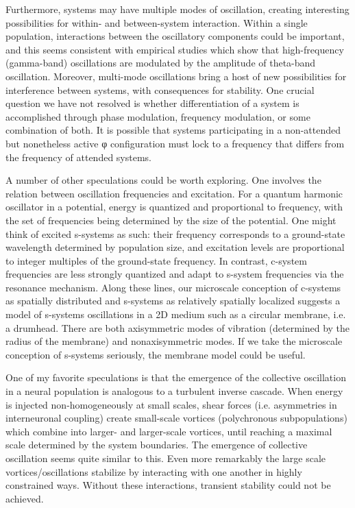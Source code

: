   Furthermore, systems may have multiple modes of oscillation, creating interesting possibilities for within- and between-system interaction. Within a single population, interactions between the oscillatory components could be important, and this seems consistent with empirical studies which show that high-frequency (gamma-band) oscillations are modulated by the amplitude of theta-band oscillation. Moreover, multi-mode oscillations bring a host of new possibilities for interference between systems, with consequences for stability. One crucial question we have not resolved is whether differentiation of a system is accomplished through phase modulation, frequency modulation, or some combination of both. It is possible that systems participating in a non-attended but nonetheless active φ configuration must lock to a frequency that differs from the frequency of attended systems.

  A number of other speculations could be worth exploring. One involves the relation between oscillation frequencies and excitation. For a quantum harmonic oscillator in a potential, energy is quantized and proportional to frequency, with the set of frequencies being determined by the size of the potential. One might think of excited s-systems as such: their frequency corresponds to a ground-state wavelength determined by population size, and excitation levels are proportional to integer multiples of the ground-state frequency. In contrast, c-system frequencies are less strongly quantized and adapt to s-system frequencies via the resonance mechanism. Along these lines, our microscale conception of c-systems as spatially distributed and s-systems as relatively spatially localized suggests a model of s-systems oscillations in a 2D medium such as a circular membrane, i.e. a drumhead. There are both axisymmetric modes of vibration (determined by the radius of the membrane) and nonaxisymmetric modes. If we take the microscale conception of s-systems seriously, the membrane model could be useful.    

  One of my favorite speculations is that the emergence of the collective oscillation in a neural population is analogous to a turbulent inverse cascade. When energy is injected non-homogeneously at small scales, shear forces (i.e. asymmetries in interneuronal coupling) create small-scale vortices (polychronous subpopulations) which combine into larger- and larger-scale vortices, until reaching a maximal scale determined by the system boundaries. The emergence of collective oscillation seems quite similar to this. Even more remarkably the large scale vortices/oscillations stabilize by interacting with one another in highly constrained ways. Without these interactions, transient stability could not be achieved.

